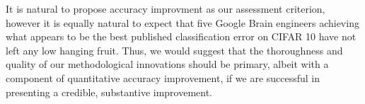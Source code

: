 \documentclass[10pt,twocolumn,letterpaper]{article}
\begin{document}
It is natural to propose accuracy improvment as our assessment criterion, however it is equally natural to expect that five Google Brain engineers achieving what appears to be the best published classification error on CIFAR 10 have not left any low hanging fruit. Thus, we would suggest that the thoroughness and quality of our methodological innovations should be primary, albeit with a component of quantitative accuracy improvement, if we are successful in presenting a credible, substantive improvement.





{\small


}
\end{document}
